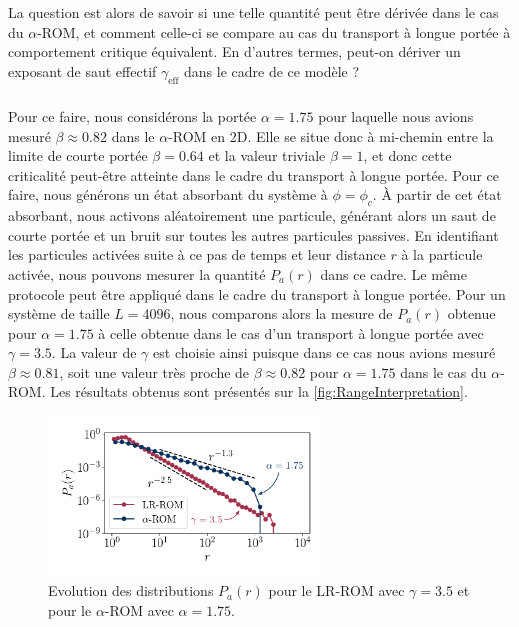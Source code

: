 \noindent La question est alors de savoir si une telle quantité peut être dérivée dans le cas du $\alpha$-ROM, et comment celle-ci se compare au cas du transport à longue portée à comportement critique équivalent. En d'autres termes, peut-on dériver un exposant de saut effectif $\gamma_\text{eff}$ dans le cadre de ce modèle ? 

\subparagraph{}Pour ce faire, nous considérons la portée $\alpha = 1.75$ pour laquelle nous avions mesuré $\beta\approx 0.82$ dans le $\alpha$-ROM en 2D. Elle se situe donc à mi-chemin entre la limite de courte portée $\beta = 0.64$ et la valeur triviale $\beta = 1$, et donc cette criticalité peut-être atteinte dans le cadre du transport à longue portée. Pour ce faire, nous générons un état absorbant du système à $\phi = \phi_c$. \`A partir de cet état absorbant, nous activons aléatoirement une particule, générant alors un saut de courte portée et un bruit sur toutes les autres particules passives. En identifiant les particules activées suite à ce pas de temps et leur distance $r$ à la particule activée, nous pouvons mesurer la quantité $P_a(r)$ dans ce cadre. Le même protocole peut être appliqué dans le cadre du transport à longue portée. Pour un système de taille $L=4096$, nous comparons alors la mesure de $P_a(r)$ obtenue pour $\alpha = 1.75$ à celle obtenue dans le cas d'un transport à longue portée avec $\gamma = 3.5$. La valeur de $\gamma$ est choisie ainsi puisque dans ce cas nous avions mesuré $\beta \approx 0.81$, soit une valeur très proche de $\beta\approx 0.82$ pour $\alpha = 1.75$ dans le cas du $\alpha$-ROM. Les résultats obtenus sont présentés sur la \autoref{fig:RangeInterpretation}.

\begin{figure}[h]
	\centering
	\includegraphics[width=0.65\textwidth]{Chapitre3/Figures/Interpretation/RangeInterpretation.pdf}
	\caption{Evolution des distributions $P_a(r)$ pour le LR-ROM avec $\gamma = 3.5$ et pour le $\alpha$-ROM avec $\alpha = 1.75$.}
	\label{fig:RangeInterpretation}
\end{figure}

